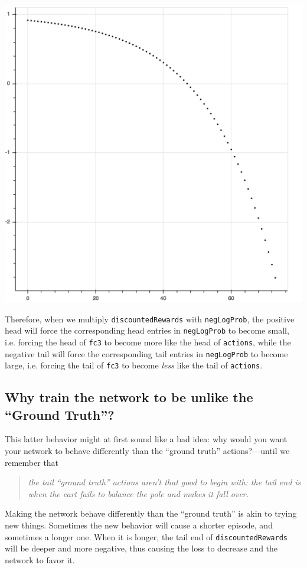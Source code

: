 \documentclass[20pt]{extarticle}
\theoremstyle{plain}
\theoremstyle{definition}
\theoremstyle{remark}
\newcommand{\0}{\varnothing}
\newcommand{\<}{\langle}
\renewcommand{\>}{\rangle}
\begin{document}
\centerline{\includegraphics[width=1.0\textwidth]{CartpoleDiscountedNormalizedRewards}}

Therefore, when we multiply \lstinline{discountedRewards} with \lstinline{negLogProb}, the positive head will force the corresponding head entries in \lstinline{negLogProb} to become small, i.e. forcing the head of \lstinline{fc3} to become more like the head of \lstinline{actions}, while the negative tail will force the corresponding tail entries in \lstinline{negLogProb} to become large, i.e. forcing the tail of \lstinline{fc3} to become \emph{less} like the tail of \lstinline{actions}.

\subsection{Why train the network to be unlike the ``Ground Truth''?}

This latter behavior might at first sound like a bad idea: why would you want your network to behave differently than the ``ground truth'' actions?---until we remember that

\large
\begin{quote}
\emph{the tail ``ground truth'' actions aren't that good to begin with: the tail end is when the cart fails to balance the pole and makes it fall over.}
\end{quote}
\normalsize
Making the network behave differently than the ``ground truth'' is akin to trying new things. Sometimes the new behavior will cause a shorter episode, and sometimes a longer one. When it is longer, the tail end of \lstinline{discountedRewards} will be deeper and more negative, thus causing the loss to decrease and the network to favor it.
\end{document}
